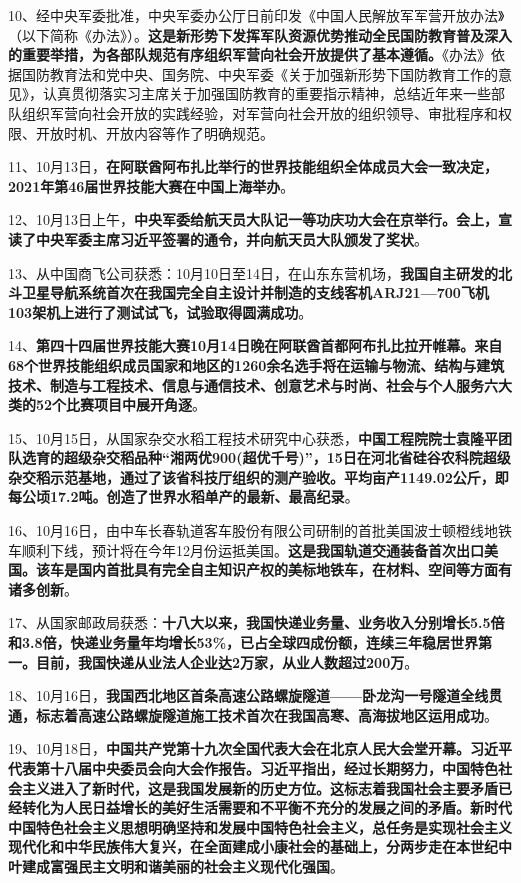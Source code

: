 {{10、经中央军委批准，中央军委办公厅日前印发《中国人民解放军军营开放办法》（以下简称《办法》）。}\textbf{{这是新形势下发挥军队资源优势推动全民国防教育普及深入的重要举措，为各部队规范有序组织军营向社会开放提供了基本遵循。}}{《办法》依据国防教育法和党中央、国务院、中央军委《关于加强新形势下国防教育工作的意见》，认真贯彻落实习主席关于加强国防教育的重要指示精神，总结近年来一些部队组织军营向社会开放的实践经验，对军营向社会开放的组织领导、审批程序和权限、开放时机、开放内容等作了明确规范。}}

{{11、10月13日，}\textbf{{在阿联酋阿布扎比举行的世界技能组织全体成员大会一致决定，2021年第46届世界技能大赛在中国上海举办}}{。}}

{{12、10月13日上午，}\textbf{{中央军委给航天员大队记一等功庆功大会在京举行。会上，宣读了中央军委主席习近平签署的通令，并向航天员大队颁发了奖状}}{。}}

{{13、从中国商飞公司获悉：10月10日至14日，在山东东营机场，}\textbf{{我国自主研发的北斗卫星导航系统首次在我国完全自主设计并制造的支线客机ARJ21---700飞机103架机上进行了测试试飞，试验取得圆满成功}}{。}}

{14、}{\textbf{{第四十四届世界技能大赛10月14日晚在阿联酋首都阿布扎比拉开帷幕。来自68个世界技能组织成员国家和地区的1260余名选手将在运输与物流、结构与建筑技术、制造与工程技术、信息与通信技术、创意艺术与时尚、社会与个人服务六大类的52个比赛项目中展开角逐}}{。}}

{{15、10月15日，从国家杂交水稻工程技术研究中心获悉，}\textbf{{中国工程院院士袁隆平团队选育的超级杂交稻品种``湘两优900(超优千号)''，15日在河北省硅谷农科院超级杂交稻示范基地，通过了该省科技厅组织的测产验收。平均亩产1149.02公斤，即每公顷17.2吨。创造了世界水稻单产的最新、最高纪录}}{。}}

{{16、10月16日，由中车长春轨道客车股份有限公司研制的首批美国波士顿橙线地铁车顺利下线，预计将在今年12月份运抵美国。}\textbf{{这是我国轨道交通装备首次出口美国。该车是国内首批具有完全自主知识产权的美标地铁车，在材料、空间等方面有诸多创新}}{。}}

{{17、从国家邮政局获悉：}\textbf{{十八大以来，我国快递业务量、业务收入分别增长5.5倍和3.8倍，快递业务量年均增长53\%，已占全球四成份额，连续三年稳居世界第一。目前，我国快递从业法人企业达2万家，从业人数超过200万}}{。}}

{{18、10月16日，}\textbf{{我国西北地区首条高速公路螺旋隧道------卧龙沟一号隧道全线贯通，标志着高速公路螺旋隧道施工技术首次在我国高寒、高海拔地区运用成功}}{。}}

{{19、10月18日，}\textbf{{中国共产党第十九次全国代表大会在北京人民大会堂开幕。习近平代表第十八届中央委员会向大会作报告。习近平指出，经过长期努力，中国特色社会主义进入了新时代，这是我国发展新的历史方位。这标志着我国社会主要矛盾已经转化为人民日益增长的美好生活需要和不平衡不充分的发展之间的矛盾。新时代中国特色社会主义思想明确坚持和发展中国特色社会主义，总任务是实现社会主义现代化和中华民族伟大复兴，在全面建成小康社会的基础上，分两步走在本世纪中叶建成富强民主文明和谐美丽的社会主义现代化强国}}{。}}

